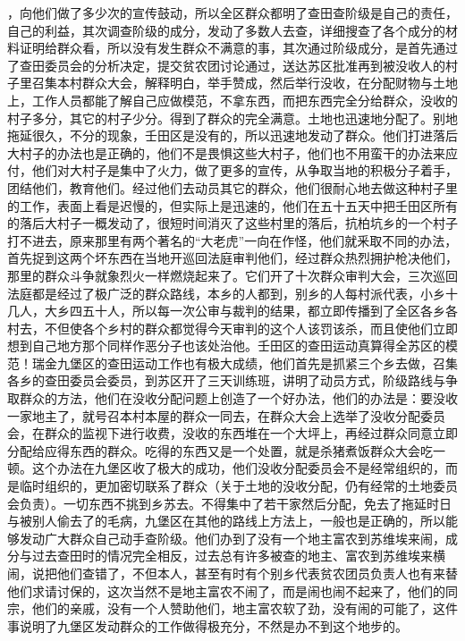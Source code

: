 ，向他们做了多少次的宣传鼓动，所以全区群众都明了查田查阶级是自己的责任，自己的利益，其次调查阶级的成分，发动了多数人去查，详细搜查了各个成分的材料证明给群众看，所以没有发生群众不满意的事，其次通过阶级成分，是首先通过了查田委员会的分析决定，提交贫农团讨论通过，送达苏区批准再到被没收人的村子里召集本村群众大会，解释明白，举手赞成，然后举行没收，在分配财物与土地上，工作人员都能了解自己应做模范，不拿东西，而把东西完全分给群众，没收的村子多分，其它的村子少分。得到了群众的完全满意。土地也迅速地分配了。别地拖延很久，不分的现象，壬田区是没有的，所以迅速地发动了群众。他们打进落后大村子的办法也是正确的，他们不是畏惧这些大村子，他们也不用蛮干的办法来应付，他们对大村子是集中了火力，做了更多的宣传，从争取当地的积极分子着手，团结他们，教育他们。经过他们去动员其它的群众，他们很耐心地去做这种村子里的工作，表面上看是迟慢的，但实际上是迅速的，他们在五十五天中把壬田区所有的落后大村子一概发动了，很短时间消灭了这些村里的落后，抗柏坑乡的一个村子打不进去，原来那里有两个著名的“大老虎”一向在作怪，他们就釆取不同的办法，首先捉到这两个坏东西在当地开巡回法庭审判他们，经过群众热烈拥护枪决他们，那里的群众斗争就象烈火一样燃烧起来了。它们开了十次群众审判大会，三次巡回法庭都是经过了极广泛的群众路线，本乡的人都到，别乡的人每村派代表，小乡十几人，大乡四五十人，所以每一次公审与裁判的结果，都立即传播到了全区各乡各村去，不但使各个乡村的群众都觉得今天审判的这个人该罚该杀，而且使他们立即想到自己地方那个同样作恶分子也该处治他。壬田区的查田运动真算得全苏区的模范！瑞金九堡区的查田运动工作也有极大成绩，他们首先是抓紧三个乡去做，召集各乡的查田委员会委员，到苏区开了三天训练班，讲明了动员方式，阶级路线与争取群众的方法，他们在没收分配问题上创造了一个好办法，他们的办法是：要没收一家地主了，就号召本村本屋的群众一同去，在群众大会上选举了没收分配委员会，在群众的监视下进行收费，没收的东西堆在一个大坪上，再经过群众同意立即分配给应得东西的群众。吃得的东西又是一个处置，就是杀猪煮饭群众大会吃一顿。这个办法在九堡区收了极大的成功，他们没收分配委员会不是经常组织的，而是临时组织的，更加密切联系了群众（关于土地的没收分配，仍有经常的土地委员会负责）。一切东西不挑到乡苏去。不得集中了若干家然后分配，免去了拖延时日与被别人偷去了的毛病，九堡区在其他的路线上方法上，一般也是正确的，所以能够发动广大群众自己动手查阶级。他们办到了没有一个地主富农到苏维埃来闹，成分与过去查田时的情况完全相反，过去总有许多被查的地主、富农到苏维埃来横闹，说把他们查错了，不但本人，甚至有时有个别乡代表贫农团员负责人也有来替他们求请讨保的，这次当然不是地主富农不闹了，而是闹也闹不起来了，他们的同宗，他们的亲戚，没有一个人赞助他们，地主富农软了劲，没有闹的可能了，这件事说明了九堡区发动群众的工作做得极充分，不然是办不到这个地步的。

